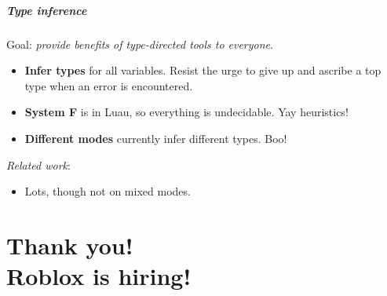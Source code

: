 \documentclass[aspectratio=169]{beamer}
\begin{document}
\begin{frame}

\frametitle{Type inference}

Goal: \emph{provide benefits of type-directed tools to everyone}.

\begin{itemize}
\item \textbf{Infer types} for all variables.  Resist the urge to give up and ascribe a top type when an error is encountered.
\item \textbf{System F} is in Luau, so everything is undecidable. Yay heuristics!
\item \textbf{Different modes} currently infer different types. Boo!
\end{itemize}

\emph{Related work}:
\begin{itemize}
\item Lots, though not on mixed modes.
\end{itemize}

\end{frame}

\part{Thank you!\\Roblox is hiring!}
\end{document}
